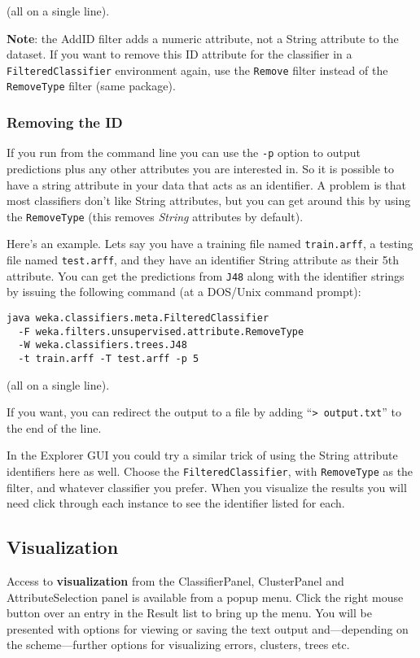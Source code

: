 \noindent (all on a single line).

\textbf{Note}: the AddID filter adds a numeric attribute, not a String
attribute to the dataset. If you want to remove this ID attribute for
the classifier in a \verb=FilteredClassifier= environment again, use the
\verb=Remove= filter instead of the \verb=RemoveType= filter (same package).

\subsubsection{Removing the ID}
If you run from the command line you can use the \verb=-p= option to output
predictions plus any other attributes you are interested in. So it is
possible to have a string attribute in your data that acts as an
identifier. A problem is that most classifiers don't like String
attributes, but you can get around this by using the \verb=RemoveType= (this
removes \textit{String} attributes by default).

Here's an example. Lets say you have a training file named \verb=train.arff=,
a testing file named \verb=test.arff=, and they have an identifier String
attribute as their 5th attribute. You can get the predictions from \verb=J48=
along with the identifier strings by issuing the following command (at
a DOS/Unix command prompt):

\begin{verbatim}
java weka.classifiers.meta.FilteredClassifier
  -F weka.filters.unsupervised.attribute.RemoveType
  -W weka.classifiers.trees.J48
  -t train.arff -T test.arff -p 5
\end{verbatim}

\noindent (all on a single line).

If you want, you can redirect the output to a file by adding
``\verb=> output.txt='' to the end of the line.

In the Explorer GUI you could try a similar trick of using the String
attribute identifiers here as well. Choose the \verb=FilteredClassifier=,
with \verb=RemoveType= as the filter, and whatever classifier you
prefer. When you visualize the results you will need click through
each instance to see the identifier listed for each.

\subsection{Visualization}
Access to \textbf{visualization} from the ClassifierPanel, ClusterPanel and
AttributeSelection panel is available from a popup menu. Click the
right mouse button over an entry in the Result list to bring up the
menu. You will be presented with options for viewing or saving the
text output and---depending on the scheme---further options for
visualizing errors, clusters, trees etc.

